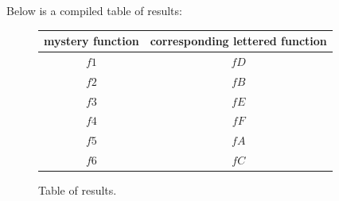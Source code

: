 \documentclass{article}
\begin{document}
	Below is a compiled table of results:
	
	\begin{figure}[H]
		\centering
		\begin{tabular}{c|c}
			mystery function & corresponding lettered function \\
			\hline
			$f1$ & $fD$ \\
			$f2$ & $fB$ \\
			$f3$ & $fE$ \\
			$f4$ & $fF$ \\
			$f5$ & $fA$ \\
			$f6$ & $fC$
		\end{tabular}
		\caption{Table of results.}
	\end{figure}
	
    
    
\end{document}
